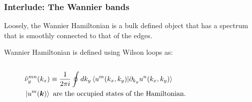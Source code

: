 \documentclass{beamer}
\renewcommand{\(}{\left(}
\renewcommand{\)}{\right)}
\renewcommand{\[}{\left[}
\renewcommand{\]}{\right]}
\begin{document}
\begin{frame}
    \frametitle{Interlude: The Wannier bands}
    Loosely, the Wannier Hamiltonian is a bulk defined object that has a spectrum that is smoothly connected to that of the edges. \pause
    
    Wannier Hamiltonian is defined using Wilson loops as: 
    \begin{columns}
        \begin{column}{0.8\textwidth}
            \begin{align*}
                &\hat\nu^{mn}_y(k_x) \equiv \frac{1}{2\pi i} \oint dk_y \braket{u^m(k_x,k_y)|\partial_{k_y}u^n(k_x,k_y)} \nonumber \\ 
                &\ket{u^{m}(\bm k )} \ \text{are the occupied states of the Hamiltonian.}
            \end{align*}
        \end{column}
        \begin{column}{0.2\textwidth}
        \end{column}
    \end{columns}\pause
    \begin{figure}[]
        \centering

\end{figure}
\end{frame}
\end{document}
